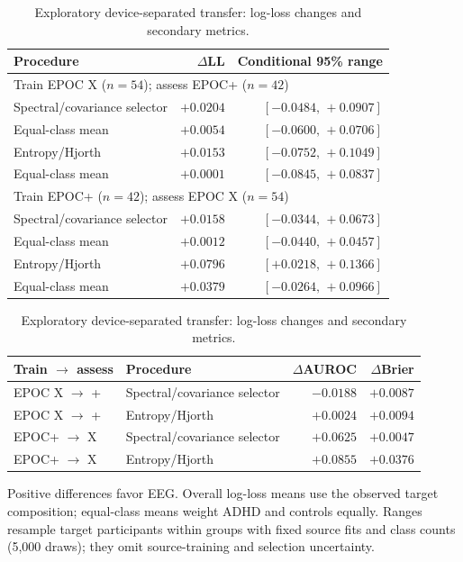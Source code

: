 \begin{table}[htbp]
\centering
\caption{Exploratory device-separated transfer: log-loss changes and secondary metrics.}
\label{tab:transfer}
\begin{tabular}{lrr}
\toprule
Procedure & $\Delta$LL & Conditional 95\% range\\
\midrule
\multicolumn{3}{l}{Train EPOC X ($n=54$); assess EPOC+ ($n=42$)}\\
Spectral/covariance selector & $+0.0204$ & $[-0.0484,\,+0.0907]$ \\
\quad Equal-class mean & $+0.0054$ & $[-0.0600,\,+0.0706]$ \\
Entropy/Hjorth & $+0.0153$ & $[-0.0752,\,+0.1049]$ \\
\quad Equal-class mean & $+0.0001$ & $[-0.0845,\,+0.0837]$ \\
\midrule
\multicolumn{3}{l}{Train EPOC+ ($n=42$); assess EPOC X ($n=54$)}\\
Spectral/covariance selector & $+0.0158$ & $[-0.0344,\,+0.0673]$ \\
\quad Equal-class mean & $+0.0012$ & $[-0.0440,\,+0.0457]$ \\
Entropy/Hjorth & $+0.0796$ & $[+0.0218,\,+0.1366]$ \\
\quad Equal-class mean & $+0.0379$ & $[-0.0264,\,+0.0966]$ \\
\bottomrule
\end{tabular}

\vspace{6pt}
\begin{tabular}{llrr}
\toprule
Train $\rightarrow$ assess & Procedure & $\Delta$AUROC & $\Delta$Brier\\
\midrule
EPOC X $\rightarrow$ + & Spectral/covariance selector & $-0.0188$ & $+0.0087$ \\
EPOC X $\rightarrow$ + & Entropy/Hjorth & $+0.0024$ & $+0.0094$ \\
EPOC+ $\rightarrow$ X & Spectral/covariance selector & $+0.0625$ & $+0.0047$ \\
EPOC+ $\rightarrow$ X & Entropy/Hjorth & $+0.0855$ & $+0.0376$ \\
\bottomrule
\end{tabular}
\par\smallskip
\begin{minipage}{\textwidth}\small
Positive differences favor EEG. Overall log-loss means use the observed target composition; equal-class means weight ADHD and controls equally. Ranges resample target participants within groups with fixed source fits and class counts (5,000 draws); they omit source-training and selection uncertainty.
\end{minipage}
\end{table}
